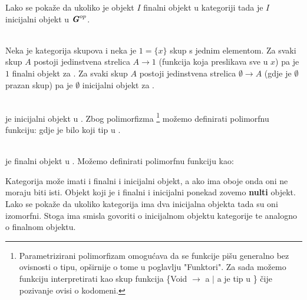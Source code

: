   Lako se pokaže da ukoliko je objekt $I$ finalni objekt u kategoriji  tada je $I$ inicijalni objekt u $\textbf{\emph{G}}^{op}$.\\
  
  \begin{example}\ \\
  
    \noindent Neka je  kategorija skupova i neka je $1 = \{x\}$ skup s jednim elementom. Za svaki skup $A$ postoji jedinstvena strelica $A \xrightarrow{} 1$ (funkcija koja preslikava sve u $x$) pa je $1$ finalni objekt za . Za svaki skup $A$ postoji jedinstvena strelica $\emptyset \xrightarrow{} A$ (gdje je $\emptyset$ prazan skup) pa je $\emptyset$ inicijalni objekt za .\\
  
  \end{example}
  
  \begin{example}\ \\
  
  \noindent {} je inicijalni objekt u .
    Zbog polimorfizma \footnote{Parametrizirani polimorfizam omogućava da se
      funkcije pišu generalno bez ovisnosti o tipu, opširnije o tome u
      poglavlju "Funktori". Za sada možemo funkciju 
      interpretirati kao skup funkcija \{Void $\to$ a $|$ a je tip u
      \} čije pozivanje ovisi o kodomeni.} možemo definirati polimorfnu funkciju:
    gdje je  bilo koji tip u .\\
  
  \end{example}
  
  \begin{example}\ \\
  
  \noindent \codei{()} je finalni objekt u .
    Možemo definirati polimorfnu funkciju  kao:
  \end{example}
  
  Kategorija  može imati i finalni i inicijalni objekt, a ako ima
  oboje onda oni ne moraju biti isti. Objekt koji je i finalni i inicijalni ponekad
  zovemo \textbf{nulti} objekt. Lako se pokaže da ukoliko kategorija ima dva inicijalna
  objekta tada su oni izomorfni. Stoga ima smisla govoriti o inicijalnom objektu
  kategorije te analogno o finalnom objektu.
  
